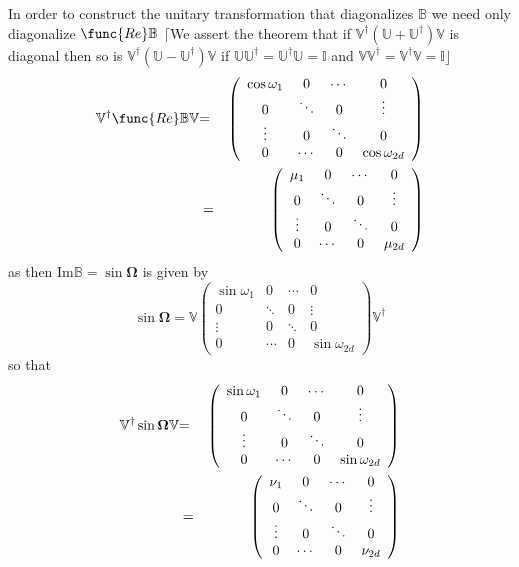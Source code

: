 \documentclass[aps,preprint]{revtex4}
\begin{document}
In order to construct the unitary transformation that diagonalizes $\mathbb{B%
}$ we need only diagonalize $\func{Re}\mathbb{B}$ $\lceil $We assert the
theorem that if $\mathbb{V}^{\dagger }\left( \mathbb{U+U}^{\dagger }\right) 
\mathbb{V}$ is diagonal then so is $\mathbb{V}^{\dagger }\left( \mathbb{U-U}%
^{\dagger }\right) \mathbb{V}$ if $\mathbb{U\mathbb{U}^{\dagger }=\mathbb{U}%
^{\dagger }U=I}$ and $\mathbb{VV^{\dagger }=V^{\dagger }V=I\rfloor }$ 
\begin{eqnarray}
\mathbb{V}^{\dagger }\func{Re}\mathbb{BV} &\mathbb{=}&\left( 
\begin{array}{cccc}
\cos \omega _{1} & 0 & \cdots & 0 \\ 
0 & \ddots & 0 & \vdots \\ 
\vdots & 0 & \ddots & 0 \\ 
0 & \cdots & 0 & \cos \omega _{2d}%
\end{array}%
\right)  \notag \\
&=&\left( 
\begin{array}{cccc}
\mu _{1} & 0 & \cdots & 0 \\ 
0 & \ddots & 0 & \vdots \\ 
\vdots & 0 & \ddots & 0 \\ 
0 & \cdots & 0 & \mu _{2d}%
\end{array}%
\right)
\end{eqnarray}%
as then Im$\mathbb{B=}\sin \mathbf{\Omega }$ is given by 
\begin{equation}
\sin \mathbf{\Omega }=\mathbb{V}\left( 
\begin{array}{cccc}
\sin \omega _{1} & 0 & \cdots & 0 \\ 
0 & \ddots & 0 & \vdots \\ 
\vdots & 0 & \ddots & 0 \\ 
0 & \cdots & 0 & \sin \omega _{2d}%
\end{array}%
\right) \mathbb{V}^{\dagger }
\end{equation}%
so that 
\begin{eqnarray}
\mathbb{V}^{\dagger }\sin \mathbf{\Omega }\mathbb{V} &\mathbf{=}&\left( 
\begin{array}{cccc}
\sin \omega _{1} & 0 & \cdots & 0 \\ 
0 & \ddots & 0 & \vdots \\ 
\vdots & 0 & \ddots & 0 \\ 
0 & \cdots & 0 & \sin \omega _{2d}%
\end{array}%
\right)  \notag \\
&=&\left( 
\begin{array}{cccc}
\nu _{1} & 0 & \cdots & 0 \\ 
0 & \ddots & 0 & \vdots \\ 
\vdots & 0 & \ddots & 0 \\ 
0 & \cdots & 0 & \nu _{2d}%
\end{array}%
\right)
\end{eqnarray}%
\end{document}

